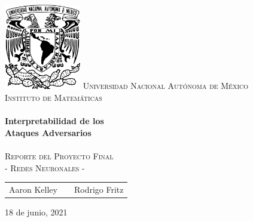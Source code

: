 \begin{titlepage}
    \begin{center}
    \includegraphics[width=0.25\textwidth]{resources/unam_escudo.png}
    \textsc{\huge Universidad Nacional Autónoma de México}\\[0.5cm]  
    \textsc{\LARGE Instituto de Matemáticas}\\[2cm]
    
    \HRule \\[0.5cm] 
    {\Huge \bfseries Interpretabilidad de los \\[1cm] Ataques Adversarios} \\[0.3cm] 
    \HRule \\[0.5cm]
    
    \textsc{\LARGE Reporte del Proyecto Final}\\[0.4cm]
    \textsc{\LARGE - Redes Neuronales - }\\[3cm]
    

    {\Large
    \begin{tabular}{ccc}
        Aaron Kelley & \hspace{1.5in} & Rodrigo Fritz
    \end{tabular}
    }
    \vfill

    {\Large 18 de junio, 2021}
    
    \end{center} 
\end{titlepage}